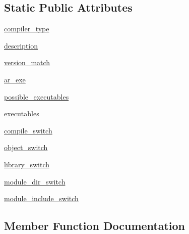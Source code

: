 \subsection*{Static Public Attributes}
\begin{DoxyCompactItemize}
\item 
\hyperlink{classnumpy_1_1distutils_1_1fcompiler_1_1intel_1_1IntelVisualFCompiler_a7d0da960442f60c2ef66f3d45db7f466}{compiler\+\_\+type}
\item 
\hyperlink{classnumpy_1_1distutils_1_1fcompiler_1_1intel_1_1IntelVisualFCompiler_aafe1d82b466fb95f4517cf8833980fe1}{description}
\item 
\hyperlink{classnumpy_1_1distutils_1_1fcompiler_1_1intel_1_1IntelVisualFCompiler_ab52c61d75d518187c0741e6985cad623}{version\+\_\+match}
\item 
\hyperlink{classnumpy_1_1distutils_1_1fcompiler_1_1intel_1_1IntelVisualFCompiler_aadf14668ccf82da37c9c52aff25d986c}{ar\+\_\+exe}
\item 
\hyperlink{classnumpy_1_1distutils_1_1fcompiler_1_1intel_1_1IntelVisualFCompiler_ae8db1153a40869a0c6d1be37f6aa6b3a}{possible\+\_\+executables}
\item 
\hyperlink{classnumpy_1_1distutils_1_1fcompiler_1_1intel_1_1IntelVisualFCompiler_aaa51d64d5d61e650d28b53aa374dc98c}{executables}
\item 
\hyperlink{classnumpy_1_1distutils_1_1fcompiler_1_1intel_1_1IntelVisualFCompiler_a1e8304a35db39894a3423b8349182887}{compile\+\_\+switch}
\item 
\hyperlink{classnumpy_1_1distutils_1_1fcompiler_1_1intel_1_1IntelVisualFCompiler_a34385d9840326719e73b002422074c48}{object\+\_\+switch}
\item 
\hyperlink{classnumpy_1_1distutils_1_1fcompiler_1_1intel_1_1IntelVisualFCompiler_a2214c35f6c93b4d0c64e3f906ff39faf}{library\+\_\+switch}
\item 
\hyperlink{classnumpy_1_1distutils_1_1fcompiler_1_1intel_1_1IntelVisualFCompiler_a122b7d3b9eb97c750201c0fb5a909220}{module\+\_\+dir\+\_\+switch}
\item 
\hyperlink{classnumpy_1_1distutils_1_1fcompiler_1_1intel_1_1IntelVisualFCompiler_a2db82dd3b329f972de3e36966492a41e}{module\+\_\+include\+\_\+switch}
\end{DoxyCompactItemize}


\subsection{Member Function Documentation}
\mbox{\label{classnumpy_1_1distutils_1_1fcompiler_1_1intel_1_1IntelVisualFCompiler_a5b14854b4f1c209a8f9b7d68a5a9e315}} 

